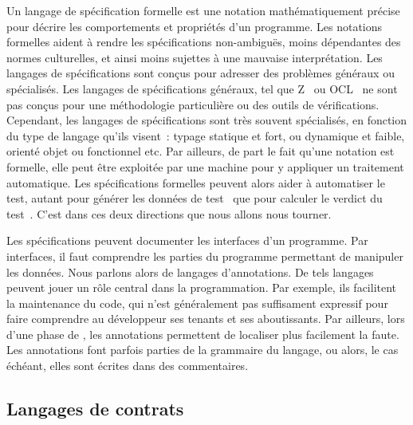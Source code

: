 Un {\strong langage de spécification} formelle est une notation mathématiquement
précise pour décrire les comportements et propriétés d'un programme. Les
{\strong notations formelles} aident à rendre les spécifications non-ambiguës,
moins dépendantes des normes culturelles, et ainsi moins sujettes à une mauvaise
interprétation. Les langages de spécifications sont conçus pour adresser des
problèmes généraux ou spécialisés. Les langages de spécifications généraux, tel
que Z~ ou OCL~ ne sont pas conçus pour une
méthodologie particulière ou des outils de vérifications. Cependant, les
langages de spécifications sont très souvent spécialisés, en fonction du type de
langage qu'ils visent~: typage statique et fort, ou dynamique et faible, orienté
objet ou fonctionnel etc. Par ailleurs, de part le fait qu'une notation est
formelle, elle peut être exploitée par une machine pour y appliquer un
traitement automatique.  Les spécifications formelles peuvent alors aider à
{\strong automatiser le test}, autant pour générer les données de
test~ que pour calculer le
verdict du test~.  C'est dans ces deux directions que nous
allons nous tourner.

Les spécifications peuvent documenter les {\strong interfaces} d'un programme.
Par interfaces, il faut comprendre les parties du programme permettant de
manipuler les données. Nous parlons alors de {\strong langages d'annotations}.
De tels langages peuvent jouer un rôle central dans la programmation. Par
exemple, ils facilitent la maintenance du code, qui n'est généralement pas
suffisament expressif pour faire comprendre au développeur ses tenants et ses
aboutissants. Par ailleurs, lors d'une phase de , les
annotations permettent de localiser plus facilement la faute. Les annotations
font parfois parties de la grammaire du langage, ou alors, le cas échéant, elles
sont écrites dans des {\strong commentaires}.

\subsection{Langages de contrats}
\label{subsection:sota:dbc}

